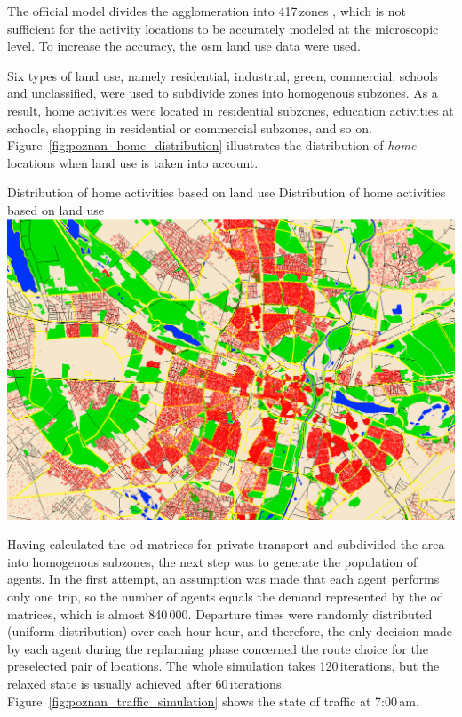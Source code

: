 The official model divides the agglomeration into 417\,zones , which is not sufficient for the activity locations to be accurately modeled at the microscopic level. To increase the accuracy, the \gls{osm} land use data were used.

Six types of land use, namely residential, industrial, green, commercial, schools and unclassified, were used to subdivide zones into homogenous subzones. As a result, home activities were located in residential subzones, education activities at schools, shopping in residential or commercial subzones, and so on. Figure~\ref{fig:poznan_home_distribution} illustrates the distribution of \emph{home} locations when land use is taken into account. 

\createfigure%
{Distribution of home activities based on land use}%
{Distribution of home activities based on land use}%
{\label{fig:poznan_home_distribution}}%
{\includegraphics[width=\textwidth, angle=0]{using/figures/poznan_home_distribution}}%
{}%

Having calculated the \gls{od} matrices for private transport and subdivided the area into homogenous subzones, the next step was to generate the population of agents. In the first attempt, an assumption was made that each agent performs only one trip, so the number of agents equals the demand represented by the \gls{od} matrices, which is almost 840\,000. Departure times were randomly distributed (uniform distribution) over each hour hour, and therefore, the only decision made by each agent during the replanning phase concerned the route choice for the preselected pair of locations. The whole simulation takes 120\,iterations, but the relaxed state is usually achieved after 60\,iterations. Figure~\ref{fig:poznan_traffic_simulation} shows the state of traffic at 7:00\,am.

